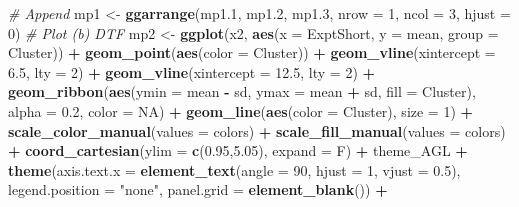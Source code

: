 \documentclass[
]{article}
\newenvironment{Shaded}{\begin{snugshade}}{\end{snugshade}}
\newcommand{\CommentTok}[1]{\textcolor[rgb]{0.56,0.35,0.01}{\textit{#1}}}
\newcommand{\DataTypeTok}[1]{\textcolor[rgb]{0.13,0.29,0.53}{#1}}
\newcommand{\DecValTok}[1]{\textcolor[rgb]{0.00,0.00,0.81}{#1}}
\newcommand{\FloatTok}[1]{\textcolor[rgb]{0.00,0.00,0.81}{#1}}
\newcommand{\KeywordTok}[1]{\textcolor[rgb]{0.13,0.29,0.53}{\textbf{#1}}}
\newcommand{\NormalTok}[1]{#1}
\newcommand{\OperatorTok}[1]{\textcolor[rgb]{0.81,0.36,0.00}{\textbf{#1}}}
\newcommand{\OtherTok}[1]{\textcolor[rgb]{0.56,0.35,0.01}{#1}}
\newcommand{\StringTok}[1]{\textcolor[rgb]{0.31,0.60,0.02}{#1}}
\begin{document}
\begin{Shaded}
\begin{Highlighting}[]
{{{{{{{{{{{{{{{{{{{{{{\CommentTok{# Append }
\NormalTok{mp1 <-}\StringTok{ }\KeywordTok{ggarrange}\NormalTok{(mp1}\FloatTok{.1}\NormalTok{, mp1}\FloatTok{.2}\NormalTok{, mp1}\FloatTok{.3}\NormalTok{, }\DataTypeTok{nrow =} \DecValTok{1}\NormalTok{, }\DataTypeTok{ncol =} \DecValTok{3}\NormalTok{, }\DataTypeTok{hjust =} \DecValTok{0}\NormalTok{)}
\CommentTok{# Plot (b) DTF }
\NormalTok{mp2 <-}\StringTok{ }\KeywordTok{ggplot}\NormalTok{(x2, }\KeywordTok{aes}\NormalTok{(}\DataTypeTok{x =}\NormalTok{ ExptShort, }\DataTypeTok{y =}\NormalTok{ mean, }\DataTypeTok{group =}\NormalTok{ Cluster)) }\OperatorTok{+}
\StringTok{  }\KeywordTok{geom_point}\NormalTok{(}\KeywordTok{aes}\NormalTok{(}\DataTypeTok{color =}\NormalTok{ Cluster)) }\OperatorTok{+}\StringTok{ }
\StringTok{  }\KeywordTok{geom_vline}\NormalTok{(}\DataTypeTok{xintercept =} \FloatTok{6.5}\NormalTok{,  }\DataTypeTok{lty =} \DecValTok{2}\NormalTok{) }\OperatorTok{+}\StringTok{ }
\StringTok{  }\KeywordTok{geom_vline}\NormalTok{(}\DataTypeTok{xintercept =} \FloatTok{12.5}\NormalTok{, }\DataTypeTok{lty =} \DecValTok{2}\NormalTok{) }\OperatorTok{+}
\StringTok{  }\KeywordTok{geom_ribbon}\NormalTok{(}\KeywordTok{aes}\NormalTok{(}\DataTypeTok{ymin =}\NormalTok{ mean }\OperatorTok{-}\StringTok{ }\NormalTok{sd, }\DataTypeTok{ymax =}\NormalTok{ mean }\OperatorTok{+}\StringTok{ }\NormalTok{sd, }\DataTypeTok{fill =}\NormalTok{ Cluster), }
              \DataTypeTok{alpha =} \FloatTok{0.2}\NormalTok{, }\DataTypeTok{color =} \OtherTok{NA}\NormalTok{) }\OperatorTok{+}\StringTok{ }
\StringTok{  }\KeywordTok{geom_line}\NormalTok{(}\KeywordTok{aes}\NormalTok{(}\DataTypeTok{color =}\NormalTok{ Cluster), }\DataTypeTok{size =} \DecValTok{1}\NormalTok{) }\OperatorTok{+}
\StringTok{  }\KeywordTok{scale_color_manual}\NormalTok{(}\DataTypeTok{values =}\NormalTok{ colors) }\OperatorTok{+}
\StringTok{  }\KeywordTok{scale_fill_manual}\NormalTok{(}\DataTypeTok{values =}\NormalTok{ colors) }\OperatorTok{+}
\StringTok{  }\KeywordTok{coord_cartesian}\NormalTok{(}\DataTypeTok{ylim =} \KeywordTok{c}\NormalTok{(}\FloatTok{0.95}\NormalTok{,}\FloatTok{5.05}\NormalTok{), }\DataTypeTok{expand =}\NormalTok{ F) }\OperatorTok{+}
\StringTok{  }\NormalTok{theme_AGL }\OperatorTok{+}
\StringTok{  }\KeywordTok{theme}\NormalTok{(}\DataTypeTok{axis.text.x =} \KeywordTok{element_text}\NormalTok{(}\DataTypeTok{angle =} \DecValTok{90}\NormalTok{, }\DataTypeTok{hjust =} \DecValTok{1}\NormalTok{, }\DataTypeTok{vjust =} \FloatTok{0.5}\NormalTok{),}
        \DataTypeTok{legend.position =} \StringTok{"none"}\NormalTok{, }\DataTypeTok{panel.grid =} \KeywordTok{element_blank}\NormalTok{()) }\OperatorTok{+}\StringTok{ }
}}}}}}}}}}}}}}}}}}}}}}
\end{Highlighting}
\end{Shaded}
\end{document}
